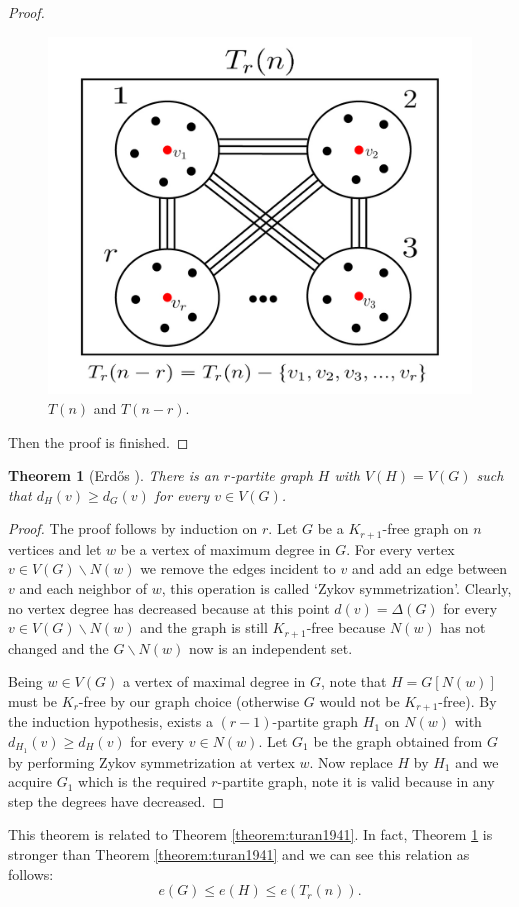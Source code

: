 \documentclass[12pt,twoside,a4paper,bibliography=totocnumbered]{book}
\numberwithin{equation}{section}
\let\setminus=\smallsetminus
\newtheorem{theorem}             {Theorem}[section]
\theoremstyle{remark}
\begin{document}
\begin{proof}
 \begin{figure}[H]
     \centering
     \includegraphics[scale=1]{Figuras/t(n)-and-t(n-r)}
     \caption{$T(n)$ and $T(n-r)$.}
     \label{fig:t(n)-and-t(n-r)}
\end{figure}
Then the proof is finished.
\end{proof}

\begin{theorem}[{Erd\H{o}s \cite{Er70}}]\label{theorem:erdos1970} There is an $ r$-partite graph $H$ with $V(H) = V(G)$ such that $d_H(v) \geq d_G(v)$ for every $v \in V(G)$.\\
\end{theorem}

\begin{proof}
The proof follows by induction on $r$. Let $G$ be a $ K_{r+1}$-free graph on $n$ vertices and let $w$ be a vertex of maximum degree in $G$. For every vertex $v \in V(G)\setminus N(w)$ we remove the edges incident to $v$ and add an edge between $v$ and each neighbor of $w$, this operation is called `Zykov symmetrization'. Clearly, no vertex degree has decreased because at this point $d(v) = \Delta(G)$ for every $v \in V(G)\setminus N(w)$ and the graph is still $K_{r+1}$-free because $N(w)$ has not changed and the $G\setminus N(w)$ now is an independent set.

Being $w\in V(G)$ a vertex of maximal degree in $G$, note that $H=G[N(w)]$ must be $K_r$-free by our graph choice (otherwise $G$ would not be $K_{r+1}$-free). By the induction hypothesis, exists a $(r-1)$-partite graph $H_1$ on $N(w)$ with $d_{H_1}(v) \geq d_{H}(v)$ for every $v \in N(w)$. Let $G_1$ be the graph obtained from $G$ by performing Zykov symmetrization at vertex $w$. Now replace $H$ by $H_1$ and we acquire $G_1$ which is the required $r$-partite graph, note it is valid because in any step the degrees have decreased.
\end{proof}
This theorem is related to Theorem \ref{theorem:turan1941}. In fact, Theorem \ref{theorem:erdos1970} is stronger than Theorem \ref{theorem:turan1941} and we can see this relation as follows: $$e(G) \leq e(H) \leq e(T_r(n)).$$
\end{document}
